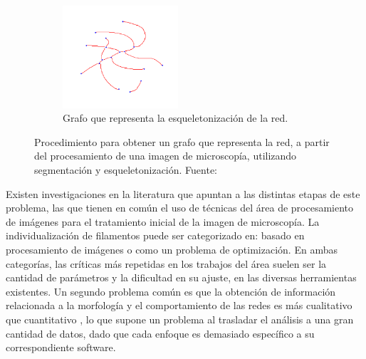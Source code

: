 \begin{intro}
\begin{figure}[h!]
    ~ 
    \begin{subfigure}[t]{0.5\textwidth}
        \centering
        \includegraphics[height=1.5in]{imagenes/graph_of_skel_no_axis.png}
        \caption{Grafo que representa la esqueletonizaci\'on de la red.}
        \label{Fig1d}
    \end{subfigure}
    \caption{Procedimiento para obtener un grafo que representa la red, a partir del procesamiento de una imagen de microscop\'ia, utilizando segmentaci\'on y esqueletonizaci\'on. Fuente: \cite{breuer2015define}}
\end{figure}

Existen investigaciones en la literatura que apuntan a las distintas etapas de este problema, las que tienen en com\'un el uso de t\'ecnicas del \'area de procesamiento de im\'agenes para el tratamiento inicial de la imagen de microscop\'ia. La individualizaci\'on de filamentos puede ser categorizado en: basado en procesamiento de im\'agenes o como un problema de optimizaci\'on. 
En ambas categor\'ias, las cr\'iticas m\'as repetidas en los trabajos del \'area suelen ser la cantidad de par\'ametros y la dificultad en su ajuste, en las diversas herramientas existentes. Un segundo problema com\'un es que la obtenci\'on de informaci\'on relacionada a la morfolog\'ia y el comportamiento de las redes es m\'as cualitativo que cuantitativo \cite{asgharzadeh2018computational}\cite{qiu2014quantitative}, lo que supone un problema al trasladar el  an\'alisis a una gran cantidad de datos, dado que cada enfoque es demasiado espec\'ifico a su correspondiente software.


\end{intro}

